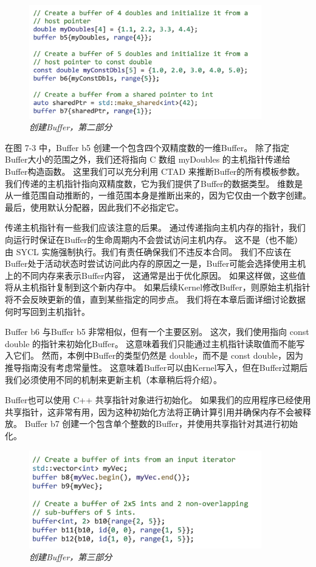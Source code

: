 \begin{figure}[H]
	\centering
	\includegraphics[width=0.9\textwidth]{figs/F7.3.png}
	\caption{\textit{创建Buffer，第二部分 }}
\end{figure}

在图 7-3 中，Buffer b5 创建一个包含四个双精度数的一维Buffer。 
除了指定Buffer大小的范围之外，我们还将指向 C 数组 myDoubles 的主机指针传递给Buffer构造函数。 
这里我们可以充分利用 CTAD 来推断Buffer的所有模板参数。 
我们传递的主机指针指向双精度数，它为我们提供了Buffer的数据类型。 
维数是从一维范围自动推断的，一维范围本身是推断出来的，因为它仅由一个数字创建。 
最后，使用默认分配器，因此我们不必指定它。

传递主机指针有一些我们应该注意的后果。 
通过传递指向主机内存的指针，我们向运行时保证在Buffer的生命周期内不会尝试访问主机内存。 
这不是（也不能）由 SYCL 实施强制执行。我们有责任确保我们不违反本合同。 
我们不应该在Buffer处于活动状态时尝试访问此内存的原因之一是，Buffer可能会选择使用主机上的不同内存来表示Buffer内容，
这通常是出于优化原因。 如果这样做，这些值将从主机指针复制到这个新内存中。 
如果后续Kernel修改Buffer，则原始主机指针将不会反映更新的值，直到某些指定的同步点。 
我们将在本章后面详细讨论数据何时写回到主机指针。

Buffer b6 与Buffer b5 非常相似，但有一个主要区别。 这次，我们使用指向 const double 的指针来初始化Buffer。 
这意味着我们只能通过主机指针读取值而不能写入它们。 
然而，本例中Buffer的类型仍然是 double，而不是 const double，因为推导指南没有考虑常量性。 
这意味着Buffer可以由Kernel写入，但在Buffer过期后我们必须使用不同的机制来更新主机（本章稍后将介绍）。

Buffer也可以使用 C++ 共享指针对象进行初始化。 
如果我们的应用程序已经使用共享指针，这非常有用，因为这种初始化方法将正确计算引用并确保内存不会被释放。 
Buffer b7 创建一个包含单个整数的Buffer，并使用共享指针对其进行初始化。

\begin{figure}[H]
	\centering
	\includegraphics[width=0.9\textwidth]{figs/F7.4.png}
	\caption{\textit{创建Buffer，第三部分 }}
\end{figure}


